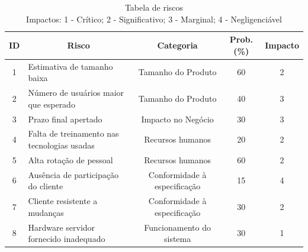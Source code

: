 \documentclass[a4paper,11pt]{article}
\begin{document}
	\begin{table}[H]
		\begin{tabular}{c|l|c|c|c}
			\textbf{ID} & \multicolumn{1}{c|}{\textbf{Risco}} & \textbf{Categoria} & \textbf{Prob.(\%)} & \textbf{Impacto} \\
			\hline
			1 & Estimativa de tamanho baixa 				& Tamanho do Produto			& 60 & 2 \\
			2 & Número de usuários maior que esperado 		& Tamanho do Produto			& 40 & 3 \\
			3 & Prazo final apertado 						& Impacto no Negócio			& 30 & 3 \\
			4 & Falta de treinamento nas tecnologias usadas	& Recursos humanos				& 20 & 2 \\
			5 & Alta rotação de pessoal 					& Recursos humanos				& 60 & 2 \\
			6 & Ausência de participação do cliente			& Conformidade à especificação	& 15 & 4 \\
			7 & Cliente resistente a mudanças 				& Conformidade à especificação	& 30 & 2 \\
			8 & Hardware servidor fornecido inadequado		& Funcionamento do sistema		& 30 & 1 \\
		\end{tabular}
		\caption{Tabela de riscos\\Impactos: 1 - Crítico; 2 - Significativo; 3 - Marginal; 4 - Negligenciável}
	\end{table}
\end{document}
